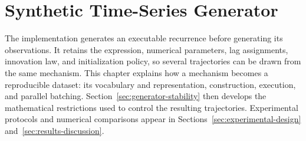 \clearpage
\section{Synthetic Time-Series Generator}
\label{sec:implemented-generator}

The implementation generates an executable recurrence before generating its
observations. It retains the expression, numerical parameters, lag assignments,
innovation law, and initialization policy, so several trajectories can be drawn
from the same mechanism. This chapter explains how a mechanism becomes a
reproducible dataset: its vocabulary and representation, construction,
execution, and parallel batching. Section~\ref{sec:generator-stability}
then develops the mathematical restrictions used to control the resulting
trajectories. Experimental protocols and numerical comparisons appear in
Sections~\ref{sec:experimental-design} and~\ref{sec:results-discussion}.








